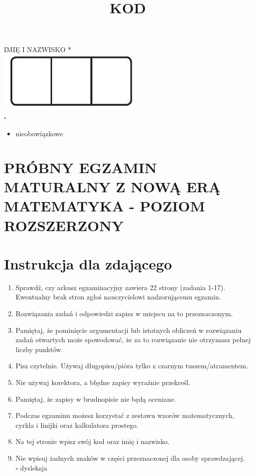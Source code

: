 \documentclass[10pt]{article}
\title{KOD }
\author{}
\date{}
\begin{document}
\maketitle
IMIĘ I NAZWISKO *\\
\includegraphics[max width=\textwidth, center]{2024_11_21_5229b9d0453456f1828dg-01}\\
\(\square\)

\begin{itemize}
  \item nieobowiązkowe
\end{itemize}

\section*{PRÓBNY EGZAMIN MATURALNY Z NOWĄ ERĄ MATEMATYKA - POZIOM ROZSZERZONY}
\section*{Instrukcja dla zdającego}
\begin{enumerate}
  \item Sprawdź, czy arkusz egzaminacyjny zawiera 22 strony (zadania 1-17). Ewentualny brak stron zgłoś nauczycielowi nadzorującemu egzamin.
  \item Rozwiązania zadań i odpowiedzi zapisz w miejscu na to przeznaczonym.
  \item Pamiętaj, że pominięcie argumentacji lub istotnych obliczeń w rozwiązaniu zadań otwartych może spowodować, że za to rozwiązanie nie otrzymasz pełnej liczby punktów.
  \item Pisz czytelnie. Używaj długopisu/pióra tylko z czarnym tuszem/atramentem.
  \item Nie używaj korektora, a błędne zapisy wyraźnie przekreśl.
  \item Pamiętaj, że zapisy w brudnopisie nie będą oceniane.
  \item Podczas egzaminu możesz korzystać z zestawu wzorów matematycznych, cyrkla i linijki oraz kalkulatora prostego.
  \item Na tej stronie wpisz swój kod oraz imię i nazwisko.
  \item Nie wpisuj żadnych znaków w części przeznaczonej dla osoby sprawdzającej.\\
\(\square\) dysleksja
\end{enumerate}
\end{document}
